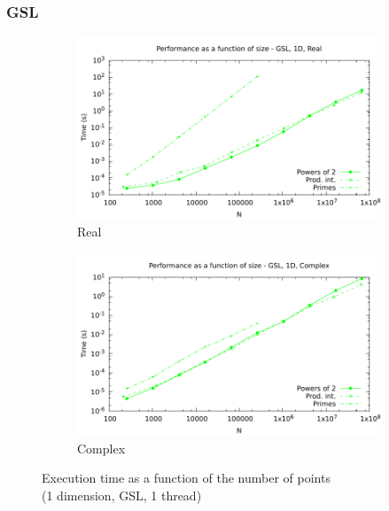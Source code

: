 \documentclass[12pt, a4paper]{article}
\begin{document}
\subsubsection{GSL}
\begin{figure}[H]
\captionsetup{width=0.8\linewidth}
\centering
\begin{subfigure}{.5\textwidth}
\centering
\includegraphics[width=.9\linewidth]{graphs/performance/1d-gsl-r.pdf}
\caption{Real}
\label{1DGSLR}
\end{subfigure}%
\begin{subfigure}{.5\textwidth}
\centering
\includegraphics[width=.9\linewidth]{graphs/performance/1d-gsl-c.pdf}
\caption{Complex}
\label{1DGSLC}
\end{subfigure}
\caption{Execution time as a function of the number of points\\(1 dimension, GSL, 1 thread)}
\label{1DGSL}
\end{figure}
\end{document}
